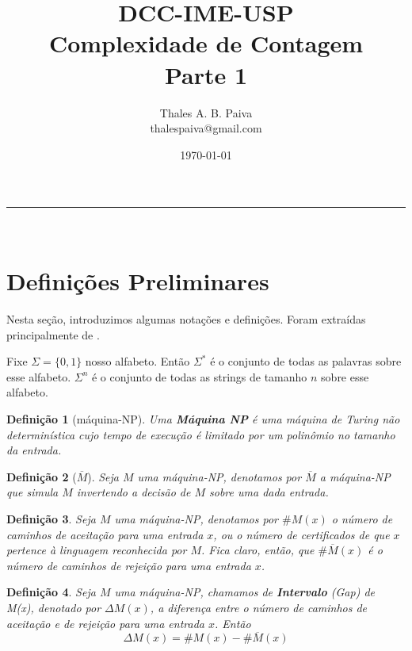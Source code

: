 \documentclass[paper=a4, fontsize=11pt]{scrartcl} %
\title{	
\normalfont \normalsize 
\textsc{DCC-IME-USP} \\ [25pt] %
\huge Complexidade de Contagem \\ Parte 1 %
}
\author{Thales A. B. Paiva \\ thalespaiva@gmail.com} %
\date{\normalsize\today} %
\newtheorem{definition}{Definição}
\numberwithin{equation}{subsection}
\numberwithin{figure}{subsection}
\numberwithin{table}{subsection}
\numberwithin{definition}{subsection}
\numberwithin{theorem}{subsection}
\numberwithin{property}{subsection}
\numberwithin{proposition}{subsection}
\newcommand{\horrule}[1]{\rule{\linewidth}{#1}} %
\newcommand{\npmach}{máquina-NP\xspace}
\renewcommand{\bar}[1]{\overline{#1}}
\begin{document}
\maketitle %
\horrule{1pt} \\[0.5cm] %

\tableofcontents



\pagebreak
\section{Definições Preliminares}

Nesta seção, introduzimos algumas notações e definições. Foram extraídas principalmente de \cite{Fortnow97}.

Fixe $\Sigma = \{0, 1\}$ nosso alfabeto. Então $\Sigma^*$ é o conjunto de todas as palavras sobre esse alfabeto. $\Sigma^n$ é o conjunto de todas as strings de tamanho $n$ sobre esse alfabeto. 

\begin{definition}[\npmach] Uma \textbf{Máquina NP} é uma máquina de Turing não determinística cujo tempo de execução é limitado por um polinômio no tamanho da entrada.
\end{definition}

\begin{definition}[$\bar{M}$] Seja $M$ uma \npmach, denotamos por \textbf{$\bar{M}$} a \npmach que simula $M$ invertendo a decisão de $M$ sobre uma dada entrada.
\end{definition}

\begin{definition} Seja $M$ uma \npmach, denotamos por $\#M(x)$ o número de caminhos de aceitação para uma entrada $x$, ou o número de certificados de que $x$ pertence à linguagem reconhecida por $M$. Fica claro, então, que $\#\bar{M}(x)$ é o número de caminhos de rejeição para uma entrada $x$.
\end{definition}

\begin{definition} Seja $M$ uma \npmach, chamamos de \textbf{Intervalo} (\textit{Gap}) de M(x), denotado por $\Delta M(x)$, a diferença entre o número de caminhos de aceitação e de rejeição para uma entrada $x$. Então
\[
\Delta M(x) = \#M(x) - \#\bar{M}(x)
\]
\end{definition}
\end{document}

